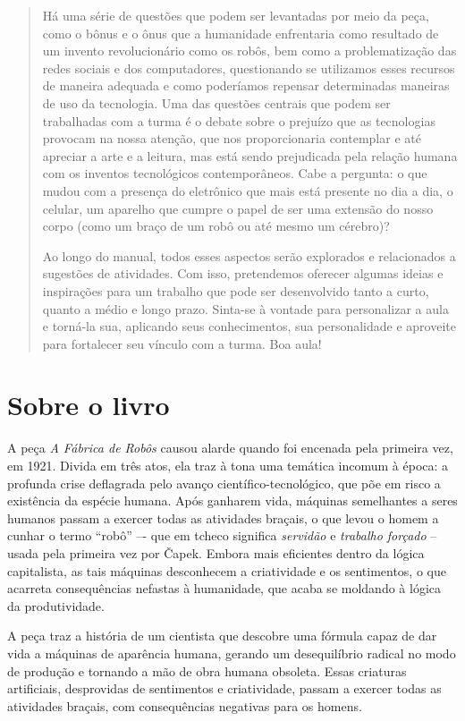 \documentclass[11pt]{extarticle}
\begin{document}
\begin{abstract}
Há uma série de questões que podem ser levantadas por meio da peça, como o bônus e o ônus que a humanidade enfrentaria como resultado de um invento revolucionário como os robôs, bem como a problematização das redes sociais e dos computadores, questionando se utilizamos esses recursos de maneira adequada e como poderíamos repensar determinadas maneiras de uso da tecnologia. Uma das questões centrais que podem ser trabalhadas com a turma é o debate sobre o prejuízo que as tecnologias provocam na nossa atenção, que nos proporcionaria contemplar e até apreciar a arte e a leitura, mas está sendo prejudicada pela relação humana com os inventos tecnológicos contemporâneos. Cabe a pergunta: o que mudou com a presença do eletrônico que mais está presente no dia a dia, o celular, um aparelho que cumpre o papel de ser uma extensão do nosso corpo (como um braço de um robô ou até mesmo um cérebro)? 

Ao longo do manual, todos esses aspectos serão explorados e relacionados a sugestões de atividades. Com isso, pretendemos oferecer algumas ideias e inspirações para um trabalho que pode ser desenvolvido tanto a curto, quanto a médio e longo prazo. Sinta-se à vontade para personalizar a aula e torná-la sua, aplicando seus conhecimentos, sua 
personalidade e aproveite para fortalecer seu vínculo com a turma.
Boa aula!

\end{abstract}

\section{Sobre o livro}

A peça \textit{A Fábrica de Robôs} causou alarde quando foi encenada pela primeira vez, em 1921. Divida em três atos, ela traz à tona uma temática incomum à época: a profunda crise deflagrada pelo avanço científico-tecnológico, que põe em risco a existência da espécie humana. Após ganharem vida, máquinas semelhantes a seres humanos passam a exercer todas as atividades braçais, o que levou o homem a cunhar o termo “robô” –- que em tcheco significa \textit{servidão} e \textit{trabalho forçado} -- usada pela primeira vez por Čapek. Embora mais eficientes dentro da lógica capitalista, as tais máquinas desconhecem a criatividade e os sentimentos, o que acarreta consequências nefastas à humanidade, que acaba se moldando à lógica da produtividade. 

A peça traz a história de um cientista que descobre uma fórmula capaz de dar vida a máquinas de aparência humana, gerando um desequilíbrio radical no modo de produção e tornando a mão de obra humana obsoleta. Essas criaturas artificiais, desprovidas de sentimentos e criatividade, passam a exercer todas as atividades braçais, com consequências negativas para os homens.
\end{document}
